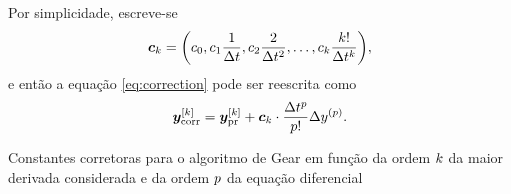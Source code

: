 Por simplicidade, escreve-se
\begin{equation*}
	\correctorConstantVector{\taylorOrder} = \pqty{\correctorConstant{0}, \correctorConstant{1}\dfrac{1}{\Dt}, \correctorConstant{2}\frac{2}{\Dt^2}, \dots, \correctorConstant{\taylorOrder}\frac{\taylorOrder!}{\Dt^\taylorOrder}},
\end{equation*}
e então a equação \eqref{eq:correction} pode ser reescrita como
\begin{equation} \label{eq:correction_simplified}
	\drvec{\taylorOrder}{\corrected{y}} = \drvec{\taylorOrder}{\predicted{y}} + \correctorConstantVector{\taylorOrder}\cdot\dfrac{\Dt^\eqOrder}{\eqOrder!}\Delta \deriv{\eqOrder}{y}.
\end{equation}
	
\begin{table}[h]
	\caption{Constantes corretoras para o algoritmo de Gear em função da ordem \(k\) da maior derivada considerada e da ordem \(p\) da equação diferencial}
	\label{table:corrector_constants}


\end{table}
